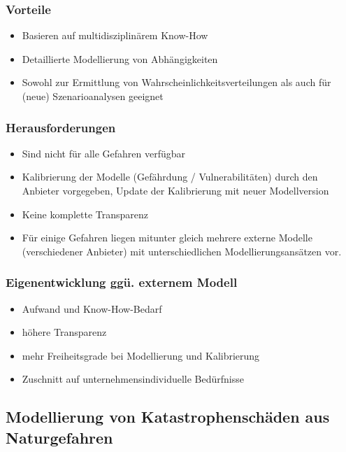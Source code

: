 \documentclass[12pt]{report}
\theoremstyle{dotless}
\theoremstyle{definition}
\begin{document}
\subsubsection{Vorteile}
\begin{itemize}
\item Basieren auf multidisziplinärem Know-How
\item Detaillierte Modellierung von Abhängigkeiten
\item Sowohl zur Ermittlung von Wahrscheinlichkeitsverteilungen als auch für (neue) Szenarioanalysen geeignet
\end{itemize}

\subsubsection{Herausforderungen}
\begin{itemize}
\item Sind nicht für alle Gefahren verfügbar
\item Kalibrierung der Modelle (Gefährdung / Vulnerabilitäten) durch den Anbieter vorgegeben, Update der Kalibrierung mit neuer Modellversion
\item Keine komplette Transparenz
\item Für einige Gefahren liegen mitunter gleich mehrere externe Modelle (verschiedener Anbieter) mit unterschiedlichen Modellierungsansätzen vor. 
\end{itemize}

\subsubsection{Eigenentwicklung ggü. externem Modell}
\begin{itemize}
\item Aufwand und Know-How-Bedarf
\item höhere Transparenz
\item mehr Freiheitsgrade bei Modellierung und Kalibrierung
\item Zuschnitt auf unternehmensindividuelle Bedürfnisse
\end{itemize}

\subsection{Modellierung von Katastrophenschäden aus Naturgefahren}
\end{document}
